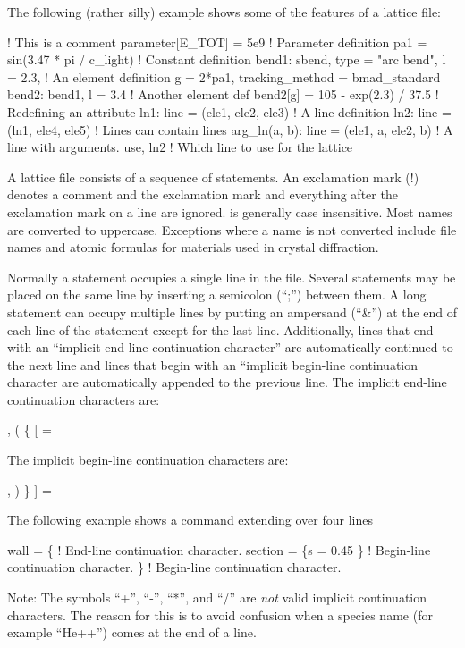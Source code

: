 The following (rather silly) example shows some of the features of a
\bmad lattice file:
\begin{example}
  ! This is a comment
  parameter[E_TOT] = 5e9                   ! Parameter definition
  pa1 = sin(3.47 * pi / c_light)                 ! Constant definition
  bend1: sbend, type = "arc bend", l = 2.3,      ! An element definition
      g = 2*pa1, tracking_method = bmad_standard
  bend2: bend1, l = 3.4                          ! Another element def
  bend2[g] = 105 - exp(2.3) / 37.5               ! Redefining an attribute
  ln1: line = (ele1, ele2, ele3)                 ! A line definition
  ln2: line = (ln1, ele4, ele5)                  ! Lines can contain lines
  arg_ln(a, b): line = (ele1, a, ele2, b)        ! A line with arguments.
  use, ln2                                       ! Which line to use for the lattice
\end{example}

A \bmad lattice file consists of a sequence of statements. An exclamation mark (!) denotes a comment
and the exclamation mark and everything after the exclamation mark on a line are ignored.  \bmad is
generally case insensitive. Most names are converted to uppercase. Exceptions where a name is not
converted include file names and atomic formulas for materials used in crystal diffraction.

Normally a statement occupies a single line in the file. Several statements may be placed on the
same line by inserting a semicolon (``;'') between them. A long statement can occupy multiple lines
by putting an ampersand (``\&'') at the end of each line of the statement except for the last
line. Additionally, lines that end with an ``implicit end-line continuation character'' are automatically
continued to the next line and lines that begin with an ``implicit begin-line continuation character are
automatically appended to the previous line. The implicit end-line continuation characters are:
\begin{example}
  ,   (   \{   [   =
\end{example}
The implicit begin-line continuation characters are:
\begin{example}
  ,   )   \}   ]   =
\end{example}
The following example shows a command extending over four lines
\begin{example}
  wall = \{               ! End-line continuation character.
    section = \{s = 0.45 
    \}                    ! Begin-line continuation character.
  \}                      ! Begin-line continuation character.
\end{example}
Note: The symbols ``+'', ``-'', ``*'', and ``/'' are {\em not} valid implicit continuation
characters. The reason for this is to avoid confusion when a species name (for example ``He++'')
comes at the end of a line.

